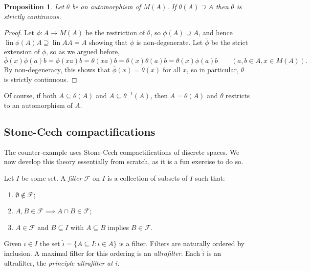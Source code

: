 \documentclass[a4paper,12pt]{article}
\theoremstyle{plain}
\newtheorem{proposition}{Proposition}[section]
\theoremstyle{definition}
\newcommand{\mc}[1]{\mathcal{#1}}
\newcommand{\lin}{\operatorname{lin}}
\begin{document}
\begin{proposition}\label{prop:contained_in_A_strictly_cts}
Let $\theta$ be an automorphism of $M(A)$.  If $\theta(A) \supseteq A$ then
$\theta$ is strictly continuous.
\end{proposition}
\begin{proof}
Let $\phi:A\rightarrow M(A)$ be the restriction of $\theta$, so
$\phi(A) \supseteq A$, and hence $\lin \phi(A)A \supseteq \lin AA = A$ showing that $\phi$ is
non-degenerate.  Let $\overline\phi$ be the strict extension of $\phi$, so as we argued before,
\[ \overline\phi(x) \phi(a) b = \phi(xa) b = \theta(xa) b = \theta(x) \theta(a) b
= \theta(x) \phi(a) b \qquad (a,b\in A, x\in M(A)). \]
By non-degeneracy, this shows that $\overline\phi(x) = \theta(x)$ for all $x$, so in particular,
$\theta$ is strictly continuous.
\end{proof}

Of course, if both $A\subseteq \theta(A)$ and $A\subseteq\theta^{-1}(A)$, then $A = \theta(A)$
and $\theta$ restricts to an automorphism of $A$.



\subsection{Stone-Cech compactifications}

The counter-example \cite{ds} uses Stone-Cech compactifications of discrete spaces.  We now develop this
theory essentially from scratch, as it is a fun exercise to do so.

Let $I$ be some set.  A \emph{filter} $\mc F$ on $I$ is a collection of subsets of $I$ such that:
\begin{enumerate}
\item $\emptyset\not\in\mc F$;
\item $A,B\in\mc F \implies A\cap B\in\mc F$;
\item $A\in\mc F$ and $B\subseteq I$ with $A\subseteq B$ implies $B\in\mc F$.
\end{enumerate}
Given $i\in I$ the set $\hat i = \{ A\subseteq I : i\in A \}$ is a filter.
Filters are naturally ordered by inclusion.  A maximal filter for this ordering is an \emph{ultrafilter}.
Each $\hat i$ is an ultrafilter, the \emph{principle ultrafilter at $i$}.
\end{document}
